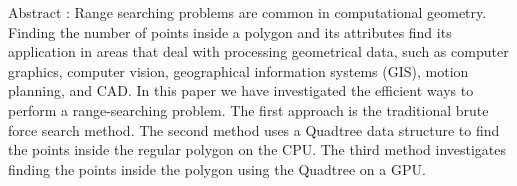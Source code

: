 
Abstract : 
Range searching problems are common in computational geometry. Finding the number of points inside a polygon and its attributes find its application in areas that deal with processing geometrical data, such as computer graphics, computer vision, geographical information systems (GIS), motion planning, and CAD. In this paper we have investigated the efficient ways to perform a range-searching problem.
The first approach is the traditional brute force search method. The second method uses a Quadtree data structure to find the points inside the regular polygon on the CPU. The third method investigates finding the points inside the polygon using the Quadtree on a GPU.
